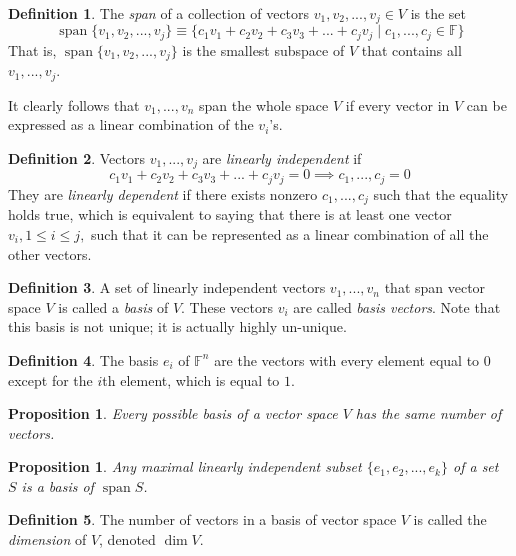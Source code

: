 \documentclass{article}
\DeclareMathOperator{\Span}{span}
\newtheorem{proposition}[theorem]{Proposition}
\theoremstyle{remark}
\theoremstyle{definition}
\newtheorem{definition}{Definition}[section]
\begin{document}
\begin{definition}
The \textit{span} of a collection of vectors $v_1, v_2, ..., v_j \in V$ is the set
\[\Span \{ v_1, v_2, ..., v_j \} \equiv \{ c_1 v_1 + c_2 v_2 + c_3 v_3 + ... + c_j v_j\; | \; c_1, ..., c_j \in \mathbb{F}\} \]
That is, $\Span \{v_1, v_2, ..., v_j\}$ is the smallest subspace of $V$ that contains all $v_1, ..., v_j$. 
\end{definition}

It clearly follows that $v_1, ..., v_n$ span the whole space $V$ if every vector in $V$ can be expressed as a linear combination of the $v_i$'s. 

\begin{definition}
Vectors $v_1, ..., v_j$ are \textit{linearly independent} if 
\[ c_1 v_1 + c_2 v_2 + c_3 v_3 + ... + c_j v_j = 0 \implies c_1, ..., c_j = 0\]
They are \textit{linearly dependent} if there exists nonzero $c_1, ..., c_j$ such that the equality holds true, which is equivalent to saying that there is at least one vector $v_i, 1 \leq i \leq j,$ such that it can be represented as a linear combination of all the other vectors. 
\end{definition}

\begin{definition}
A set of linearly independent vectors $v_1, ..., v_n$ that span vector space $V$ is called a \textit{basis} of $V$. These vectors $v_i$ are called \textit{basis vectors}. Note that this basis is not unique; it is actually highly un-unique. 
\end{definition}

\begin{definition}
The basis $e_i$ of $\mathbb{F}^n$ are the vectors with every element equal to $0$ except for the $i$th element, which is equal to $1$. 
\end{definition}

\begin{proposition}
Every possible basis of a vector space $V$ has the same number of vectors.
\end{proposition}

\begin{proposition}
Any maximal linearly independent subset $\{ e_1, e_2, ..., e_k\}$ of a set $S$ is a basis of $\Span S$. 
\end{proposition}

\begin{definition}
The number of vectors in a basis of vector space $V$ is called the \textit{dimension} of $V$, denoted $\dim{V}$. 
\end{definition}
\end{document}
